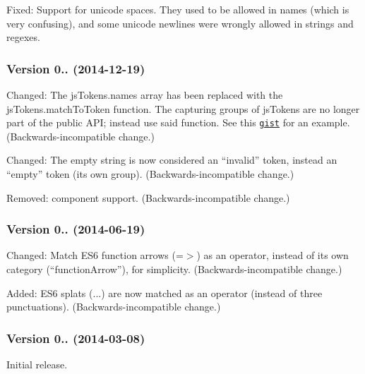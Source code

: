 \begin{DoxyItemize}
\item Fixed\+: Support for unicode spaces. They used to be allowed in names (which is very confusing), and some unicode newlines were wrongly allowed in strings and regexes.
\end{DoxyItemize}

\subsubsection*{Version 0.. (2014-\/12-\/19)}


\begin{DoxyItemize}
\item Changed\+: The {\ttfamily js\+Tokens.\+names} array has been replaced with the {\ttfamily js\+Tokens.\+match\+To\+Token} function. The capturing groups of {\ttfamily js\+Tokens} are no longer part of the public A\+PI; instead use said function. See this \href{https://gist.github.com/lydell/be49dbf80c382c473004}{\tt gist} for an example. (Backwards-\/incompatible change.)
\item Changed\+: The empty string is now considered an “invalid” token, instead an “empty” token (its own group). (Backwards-\/incompatible change.)
\item Removed\+: component support. (Backwards-\/incompatible change.)
\end{DoxyItemize}

\subsubsection*{Version 0.. (2014-\/06-\/19)}


\begin{DoxyItemize}
\item Changed\+: Match E\+S6 function arrows ({\ttfamily =$>$}) as an operator, instead of its own category (“function\+Arrow”), for simplicity. (Backwards-\/incompatible change.)
\item Added\+: E\+S6 splats ({\ttfamily ...}) are now matched as an operator (instead of three punctuations). (Backwards-\/incompatible change.)
\end{DoxyItemize}

\subsubsection*{Version 0.. (2014-\/03-\/08)}


\begin{DoxyItemize}
\item Initial release. 
\end{DoxyItemize}